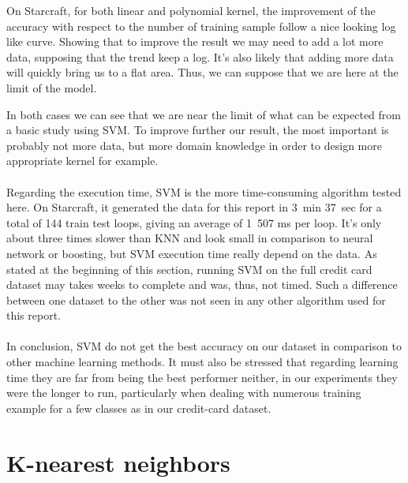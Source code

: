 \documentclass[twocolumn,a4paper,10pt]{article}
\begin{document}
On Starcraft, for both linear and polynomial kernel, the improvement
of the accuracy with respect to the number of training sample follow
a nice looking log like curve. Showing that to improve the result
we may need to add a lot more data, supposing that the trend keep
a log. It's also likely that adding more data will quickly bring us
to a flat area. Thus, we can suppose that we are here at the limit
of the model.

In both cases we can see that we are near the limit of what can be
expected from a basic study using SVM. To improve further our result,
the most important is probably not more data, but more domain knowledge
in order to design more appropriate kernel for example.

\paragraph{}

Regarding the execution time, SVM is the more time-consuming algorithm
tested here. On Starcraft, it generated the data for this report in
3~min 37~sec for a total of 144 train test loops, giving an average
of 1~507 ms per loop. It's only about three times slower than KNN
and look small in comparison to neural network or boosting, but SVM
execution time really depend on the data. As stated at the beginning
of this section, running SVM on the full credit card dataset may takes
weeks to complete and was, thus, not timed. Such a difference between
one dataset to the other was not seen in any other algorithm used
for this report.

\paragraph{}

In conclusion, SVM do not get the best accuracy on our dataset in
comparison to other machine learning methods. It must also be stressed
that regarding learning time they are far from being the best performer
neither, in our experiments they were the longer to run, particularly
when dealing with numerous training example for a few classes as in
our credit-card dataset.

\section{K-nearest neighbors}

\paragraph{}
\end{document}
